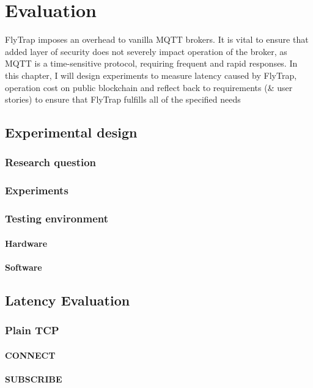 \chapter{Evaluation}\label{chap:evaluation}
FlyTrap imposes an overhead to vanilla MQTT brokers. It is vital to ensure that added layer of security does not severely impact operation of the broker, as MQTT is a time-sensitive protocol, requiring frequent and rapid responses. In this chapter, I will design experiments to measure latency caused by FlyTrap, operation cost on public blockchain and reflect back to requirements (\& user stories) to ensure that FlyTrap fulfills all of the specified needs

\section{Experimental design}
\subsection{Research question}
\subsection{Experiments}
\subsection{Testing environment}
\subsubsection{Hardware}
\subsubsection{Software}


\section{Latency Evaluation}
\subsection{Plain TCP}
\subsubsection{CONNECT}
\subsubsection{SUBSCRIBE}
